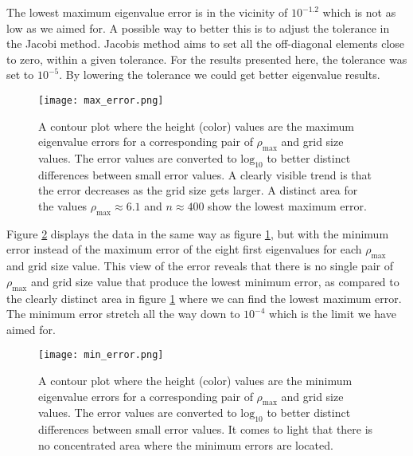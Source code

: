 \documentclass{emulateapj}
\begin{document}
        The lowest maximum eigenvalue error is in the vicinity of $10^{-1.2}$ which is not as low as we aimed for. A possible way to better this is to adjust the tolerance in the Jacobi method. Jacobis method aims to set all the off-diagonal elements close to zero, within a given tolerance. For the results presented here, the tolerance was set to $10^{-5}$. By lowering the tolerance we could get better eigenvalue results.
        
        \begin{figure}[t]
            \centering
            \texttt{[image: max\_error.png]}
            \caption{A contour plot where the height (color) values are the maximum eigenvalue errors for a corresponding pair of $\rho_{\text{max}}$ and grid size values. The error values are converted to $\text{log}_{10}$ to better distinct differences between small error values. A clearly visible trend is that the error decreases as the grid size gets larger. A distinct area for the values $\rho_{\text{max}} \approx 6.1$ and $n\approx 400$ show the lowest maximum error.}
            \label{fig:max_error}
        \end{figure}{}
        
        Figure \ref{fig:min_error} displays the data in the same way as figure \ref{fig:max_error}, but with the minimum error instead of the maximum error of the eight first eigenvalues for each $\rho_{\text{max}}$ and grid size value. This view of the error reveals that there is no single pair of $\rho_{\text{max}}$ and grid size value that produce the lowest minimum error, as compared to the clearly distinct area in figure \ref{fig:max_error} where we can find the lowest maximum error. The minimum error stretch all the way down to $10^{-4}$ which is the limit we have aimed for.
        
        \begin{figure}[t]
            \centering
            \texttt{[image: min\_error.png]}
            \caption{A contour plot where the height (color) values are the minimum eigenvalue errors for a corresponding pair of $\rho_{\text{max}}$ and grid size values. The error values are converted to $\text{log}_{10}$ to better distinct differences between small error values. It comes to light that there is no concentrated area where the minimum errors are located.}
            \label{fig:min_error}
        \end{figure}{}
        
\end{document}
